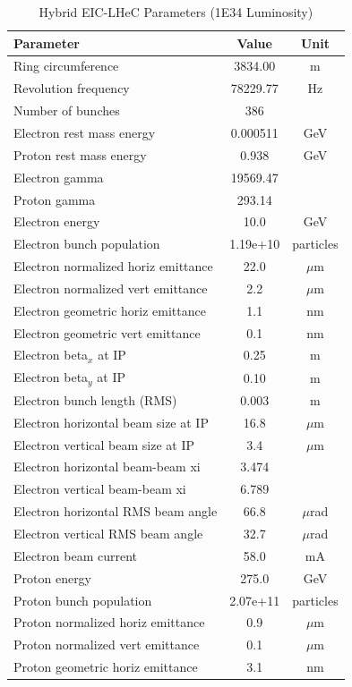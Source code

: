 \documentclass{article}
\begin{document}
\begin{longtable}{lcc}
\caption{Hybrid EIC-LHeC Parameters (1E34 Luminosity)} \\
\toprule
Parameter & Value & Unit \\
\midrule
Ring circumference & 3834.00 & m \\
Revolution frequency & 78229.77 & Hz \\
Number of bunches & 386 &  \\
Electron rest mass energy & 0.000511 & GeV \\
Proton rest mass energy & 0.938 & GeV \\
Electron gamma & 19569.47 &  \\
Proton gamma & 293.14 &  \\
Electron energy & 10.0 & GeV \\
Electron bunch population & 1.19e+10 & particles \\
Electron normalized horiz emittance & 22.0 & $\mu$m \\
Electron normalized vert emittance & 2.2 & $\mu$m \\
Electron geometric horiz emittance & 1.1 & nm \\
Electron geometric vert emittance & 0.1 & nm \\
Electron beta$_x$ at IP & 0.25 & m \\
Electron beta$_y$ at IP & 0.10 & m \\
Electron bunch length (RMS) & 0.003 & m \\
Electron horizontal beam size at IP & 16.8 & $\mu$m \\
Electron vertical beam size at IP & 3.4 & $\mu$m \\
Electron horizontal beam-beam xi & 3.474 &  \\
Electron vertical beam-beam xi & 6.789 &  \\
Electron horizontal RMS beam angle & 66.8 & $\mu$rad \\
Electron vertical RMS beam angle & 32.7 & $\mu$rad \\
Electron beam current & 58.0 & mA \\
Proton energy & 275.0 & GeV \\
Proton bunch population & 2.07e+11 & particles \\
Proton normalized horiz emittance & 0.9 & $\mu$m \\
Proton normalized vert emittance & 0.1 & $\mu$m \\
Proton geometric horiz emittance & 3.1 & nm \\

\end{longtable}
\end{document}
